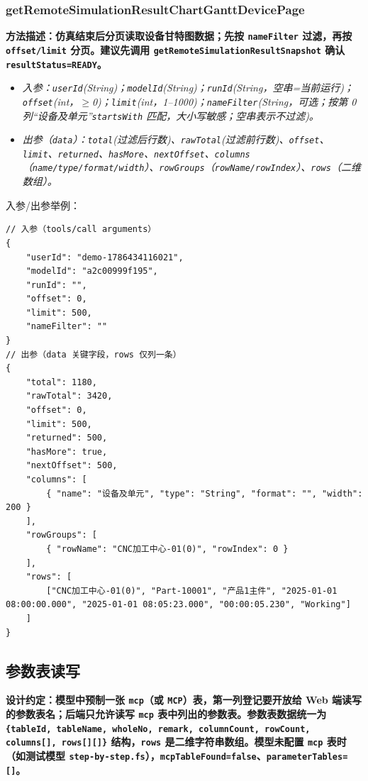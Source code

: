 \subsubsection{getRemoteSimulationResultChartGanttDevicePage}
\bf{方法描述}：仿真结束后分页读取设备甘特图数据；先按 \texttt{nameFilter} 过滤，再按 \texttt{offset/limit} 分页。建议先调用 \texttt{getRemoteSimulationResultSnapshot} 确认 \texttt{resultStatus=READY}。
\begin{itemize}
	\item \it{入参}：\texttt{userId}(String)；\texttt{modelId}(String)；\texttt{runId}(String，空串=当前运行)；\texttt{offset}(int，$\geq$0)；\texttt{limit}(int，1--1000)；\texttt{nameFilter}(String，可选；按第 0 列“设备及单元”\texttt{startsWith} 匹配，大小写敏感；空串表示不过滤)。
	\item \it{出参}（\texttt{data}）：\texttt{total}(过滤后行数)、\texttt{rawTotal}(过滤前行数)、\texttt{offset}、\texttt{limit}、\texttt{returned}、\texttt{hasMore}、\texttt{nextOffset}、\texttt{columns}（\texttt{name/type/format/width}）、\texttt{rowGroups}（\texttt{rowName/rowIndex}）、\texttt{rows}（二维数组）。
\end{itemize}
入参/出参举例：
\begin{lstlisting}
// 入参（tools/call arguments）
{
    "userId": "demo-1786434116021",
    "modelId": "a2c00999f195",
    "runId": "",
    "offset": 0,
    "limit": 500,
    "nameFilter": ""
}
// 出参（data 关键字段，rows 仅列一条）
{
    "total": 1180,
    "rawTotal": 3420,
    "offset": 0,
    "limit": 500,
    "returned": 500,
    "hasMore": true,
    "nextOffset": 500,
    "columns": [
        { "name": "设备及单元", "type": "String", "format": "", "width": 200 }
    ],
    "rowGroups": [
        { "rowName": "CNC加工中心-01(0)", "rowIndex": 0 }
    ],
    "rows": [
        ["CNC加工中心-01(0)", "Part-10001", "产品1主件", "2025-01-01 08:00:00.000", "2025-01-01 08:05:23.000", "00:00:05.230", "Working"]
    ]
}
\end{lstlisting}\vspace{-30pt}

\subsection{参数表读写}
\bf{设计约定}：模型中预制一张 \texttt{mcp}（或 \texttt{MCP}）表，第一列登记要开放给 Web 端读写的参数表名；后端只允许读写 \texttt{mcp} 表中列出的参数表。参数表数据统一为 \texttt{\{tableId, tableName, wholeNo, remark, columnCount, rowCount, columns[], rows[][]\}} 结构，\texttt{rows} 是二维字符串数组。模型未配置 \texttt{mcp} 表时（如测试模型 \texttt{step-by-step.fs}），\texttt{mcpTableFound=false}、\texttt{parameterTables=[]}。

